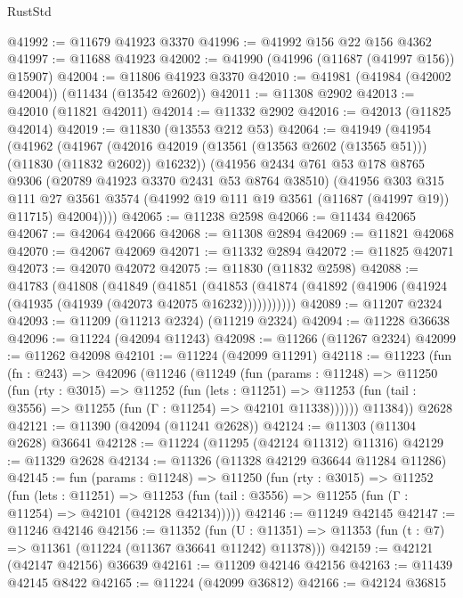 \begin{lexlean}{RustStd}
\begin{coremodule}
@41992 := @11679 @41923 @3370
@41996 := @41992 @156 @22 @156 @4362
@41997 := @11688 @41923
@42002 := @41990 (@41996 (@11687 (@41997 @156)) @15907)
@42004 := @11806 @41923 @3370
@42010 := @41981 (@41984 (@42002 @42004)) (@11434 (@13542 @2602))
@42011 := @11308 @2902
@42013 := @42010 (@11821 @42011)
@42014 := @11332 @2902
@42016 := @42013 (@11825 @42014)
@42019 := @11830 (@13553 @212 @53)
@42064 := @41949
    (@41954
      (@41962
        (@41967 (@42016 @42019 (@13561 (@13563 @2602 (@13565 @51))) (@11830 (@11832 @2602)) @16232))
        (@41956
          @2434
          @761
          @53
          @178
          @8765
          @9306
          (@20789 @41923 @3370 @2431 @53 @8764 @38510)
          (@41956
            @303
            @315
            @111
            @27
            @3561
            @3574
            (@41992 @19 @111 @19 @3561 (@11687 (@41997 @19)) @11715)
            @42004))))
@42065 := @11238 @2598
@42066 := @11434 @42065
@42067 := @42064 @42066
@42068 := @11308 @2894
@42069 := @11821 @42068
@42070 := @42067 @42069
@42071 := @11332 @2894
@42072 := @11825 @42071
@42073 := @42070 @42072
@42075 := @11830 (@11832 @2598)
@42088 := @41783
    (@41808
      (@41849
        (@41851
          (@41853 (@41874 (@41892 (@41906 (@41924 (@41935 (@41939 (@42073 @42075 @16232)))))))))))
@42089 := @11207 @2324
@42093 := @11209 (@11213 @2324) (@11219 @2324)
@42094 := @11228 @36638
@42096 := @11224 (@42094 @11243)
@42098 := @11266 (@11267 @2324)
@42099 := @11262 @42098
@42101 := @11224 (@42099 @11291)
@42118 := @11223
    (fun (fn : @243) =>
    @42096
      (@11246
        (@11249
          (fun (params : @11248) =>
          @11250
            (fun (rty : @3015) =>
            @11252
              (fun (lets : @11251) =>
              @11253 (fun (tail : @3556) => @11255 (fun (Γ : @11254) => @42101 @11338))))))
        @11384))
    @2628
@42121 := @11390 (@42094 (@11241 @2628))
@42124 := @11303 (@11304 @2628) @36641
@42128 := @11224 (@11295 (@42124 @11312) @11316)
@42129 := @11329 @2628
@42134 := @11326 (@11328 @42129 @36644 @11284 @11286)
@42145 := fun (params : @11248) =>
  @11250
    (fun (rty : @3015) =>
    @11252
      (fun (lets : @11251) =>
      @11253 (fun (tail : @3556) => @11255 (fun (Γ : @11254) => @42101 (@42128 @42134)))))
@42146 := @11249 @42145
@42147 := @11246 @42146
@42156 := @11352
    (fun (U : @11351) => @11353 (fun (t : @7) => @11361 (@11224 (@11367 @36641 @11242) @11378)))
@42159 := @42121 (@42147 @42156) @36639
@42161 := @11209 @42146 @42156
@42163 := @11439 @42145 @8422
@42165 := @11224 (@42099 @36812)
@42166 := @42124 @36815

\end{coremodule}
\end{lexlean}

